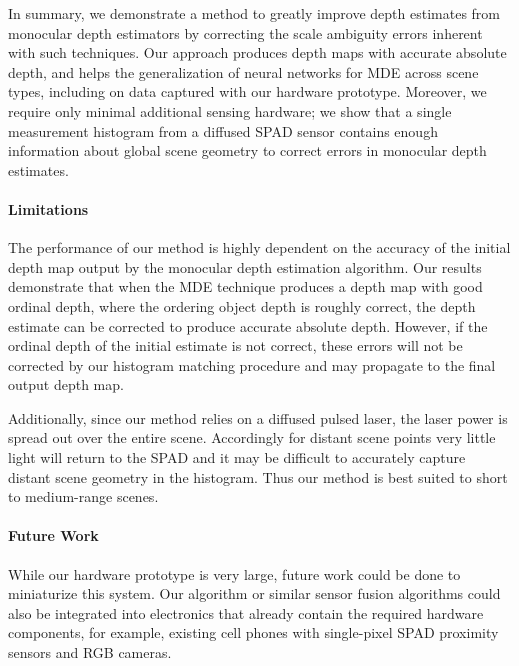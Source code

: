 In summary, we demonstrate a method to greatly improve depth estimates from
monocular depth estimators by correcting the scale ambiguity errors inherent
with such techniques.  Our approach produces depth maps with accurate absolute
depth, and helps the generalization of neural networks for MDE across scene
types, including on data captured with our hardware prototype.  Moreover, we
require only minimal additional sensing hardware; we show that a single measurement
histogram from a diffused SPAD sensor contains enough information about global
scene geometry to correct errors in monocular depth estimates.

\paragraph{Limitations}
The performance of our method is highly dependent on the accuracy of the initial depth map output by the monocular depth estimation algorithm.
Our results demonstrate that when the MDE technique produces a depth map
with good ordinal depth, where the ordering object depth is roughly correct, the
depth estimate can be corrected to produce accurate absolute depth. However, if the ordinal depth of the initial estimate is not correct, these errors will not be corrected by our histogram matching procedure and may propagate to the final output depth map.

Additionally, since our method relies on a diffused pulsed laser, the laser
power is spread out over the entire scene. Accordingly for distant scene points very
little light will return to the SPAD and it may be difficult to accurately
capture distant scene geometry in the histogram. Thus our method is best suited to short to medium-range scenes.

\paragraph{Future Work}
While our hardware prototype is very large, future work could be done to
miniaturize this system. Our algorithm or similar sensor fusion algorithms could
also be integrated into electronics that already contain the required hardware
components, for example, existing cell phones with single-pixel SPAD
proximity sensors and RGB cameras.

